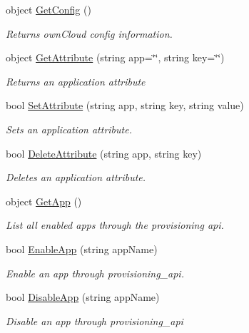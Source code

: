 \begin{DoxyCompactItemize}
object \hyperlink{classowncloudsharp_1_1_client_a8815e55195807037bd6c8d239ff7369a}{Get\+Config} ()
\begin{DoxyCompactList}\small\item\em Returns own\+Cloud config information. \end{DoxyCompactList}\item 
object \hyperlink{classowncloudsharp_1_1_client_afb8ad7cb10feb92462a4792661654537}{Get\+Attribute} (string app=\char`\"{}\char`\"{}, string key=\char`\"{}\char`\"{})
\begin{DoxyCompactList}\small\item\em Returns an application attribute \end{DoxyCompactList}\item 
bool \hyperlink{classowncloudsharp_1_1_client_a0939782439f44c5250d66147755d4c25}{Set\+Attribute} (string app, string key, string value)
\begin{DoxyCompactList}\small\item\em Sets an application attribute. \end{DoxyCompactList}\item 
bool \hyperlink{classowncloudsharp_1_1_client_ad94e83b297c9de310beafd878fd99bc4}{Delete\+Attribute} (string app, string key)
\begin{DoxyCompactList}\small\item\em Deletes an application attribute. \end{DoxyCompactList}\item 
object \hyperlink{classowncloudsharp_1_1_client_ad781c23e20eee028f3b05ffd722b8c27}{Get\+App} ()
\begin{DoxyCompactList}\small\item\em List all enabled apps through the provisioning api. \end{DoxyCompactList}\item 
bool \hyperlink{classowncloudsharp_1_1_client_a4023a60f6fa18288d4b9cf8cba705e7c}{Enable\+App} (string app\+Name)
\begin{DoxyCompactList}\small\item\em Enable an app through provisioning\+\_\+api. \end{DoxyCompactList}\item 
bool \hyperlink{classowncloudsharp_1_1_client_a77306ba08609c9cf128e62b955227648}{Disable\+App} (string app\+Name)
\begin{DoxyCompactList}\small\item\em Disable an app through provisioning\+\_\+api \end{DoxyCompactList}\end{DoxyCompactItemize}


